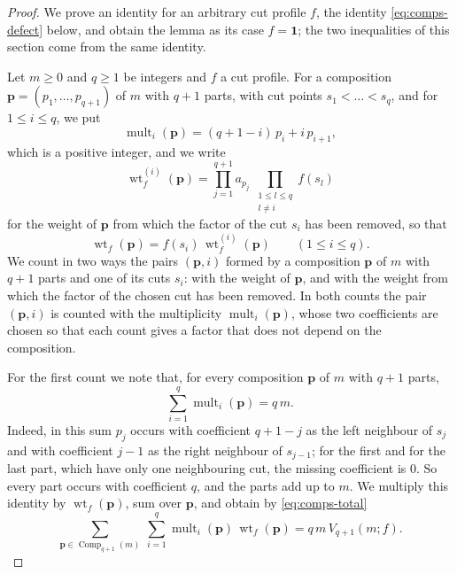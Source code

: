 \documentclass{amsart}
\theoremstyle{definition}
\theoremstyle{remark}
\numberwithin{equation}{section}
\begin{document}
\begin{proof}
We prove an identity for an arbitrary cut profile $f$, the identity \eqref{eq:comps-defect} below, and obtain the lemma as its case $f=\mathbf 1$; the two inequalities of this section come from the same identity.

Let $m\ge 0$ and $q\ge 1$ be integers and $f$ a cut profile. For a composition $\mathbf p=(p_1,\dots,p_{q+1})$ of $m$ with $q+1$ parts, with cut points $s_1<\dots<s_q$, and for $1\le i\le q$, we put
\[
\operatorname{mult}_i(\mathbf p)=(q+1-i)\,p_i+i\,p_{i+1},
\]
which is a positive integer, and we write
\[
\operatorname{wt}_f^{(i)}(\mathbf p)=\prod_{j=1}^{q+1}a_{p_j}\ \prod_{\substack{1\le l\le q\\ l\ne i}}f(s_l)
\]
for the weight of $\mathbf p$ from which the factor of the cut $s_i$ has been removed, so that
\[
\operatorname{wt}_f(\mathbf p)=f(s_i)\,\operatorname{wt}_f^{(i)}(\mathbf p)\qquad(1\le i\le q).
\]
We count in two ways the pairs $(\mathbf p,i)$ formed by a composition $\mathbf p$ of $m$ with $q+1$ parts and one of its cuts $s_i$: with the weight of $\mathbf p$, and with the weight from which the factor of the chosen cut has been removed. In both counts the pair $(\mathbf p,i)$ is counted with the multiplicity $\operatorname{mult}_i(\mathbf p)$, whose two coefficients are chosen so that each count gives a factor that does not depend on the composition.

For the first count we note that, for every composition $\mathbf p$ of $m$ with $q+1$ parts,
\begin{equation}\label{eq:comps-first}
\sum_{i=1}^{q}\operatorname{mult}_i(\mathbf p)=q\,m.
\end{equation}
Indeed, in this sum $p_j$ occurs with coefficient $q+1-j$ as the left neighbour of $s_j$ and with coefficient $j-1$ as the right neighbour of $s_{j-1}$; for the first and for the last part, which have only one neighbouring cut, the missing coefficient is $0$. So every part occurs with coefficient $q$, and the parts add up to $m$. We multiply this identity by $\operatorname{wt}_f(\mathbf p)$, sum over $\mathbf p$, and obtain by \eqref{eq:comps-total}
\begin{equation}\label{eq:comps-full}
\sum_{\mathbf p\in\operatorname{Comp}_{q+1}(m)}\ \sum_{i=1}^{q}\operatorname{mult}_i(\mathbf p)\,\operatorname{wt}_f(\mathbf p)=q\,m\,V_{q+1}(m;f).
\end{equation}


\end{proof}
\end{document}
